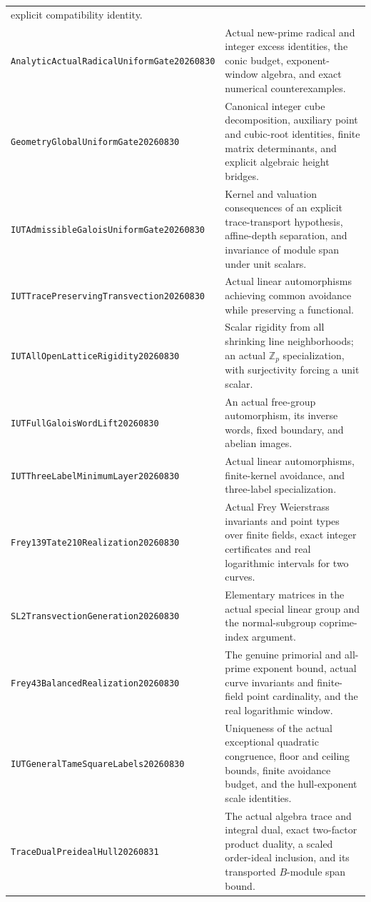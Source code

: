 \documentclass[11pt]{amsart}
\theoremstyle{definition}
\theoremstyle{remark}
\newcommand{\Z}{\mathbb Z}
\begin{document}
\begin{longtable}{>{\raggedright\arraybackslash}p{}>{\raggedright\arraybackslash}p{}}
explicit compatibility identity.\\[3pt]
\texttt{AnalyticActualRadical\allowbreak UniformGate20260830} & Actual new-prime
radical and integer excess identities, the conic budget, exponent-window
algebra, and exact numerical counterexamples.\\[3pt]
\texttt{GeometryGlobal\allowbreak UniformGate20260830} & Canonical integer cube
decomposition, auxiliary point and cubic-root identities, finite matrix
determinants, and explicit algebraic height bridges.\\[3pt]
\texttt{IUTAdmissibleGalois\allowbreak UniformGate20260830} & Kernel and valuation
consequences of an explicit trace-transport hypothesis, affine-depth
separation, and invariance of module span under unit scalars.\\[3pt]
\texttt{IUTTracePreserving\allowbreak Transvection20260830} & Actual linear
automorphisms achieving common avoidance while preserving a functional.\\[3pt]
\texttt{IUTAllOpenLattice\allowbreak Rigidity20260830} & Scalar rigidity from
all shrinking line neighborhoods; an actual $\Z_p$ specialization, with
surjectivity forcing a unit scalar.\\[3pt]
\texttt{IUTFullGalois\allowbreak WordLift20260830} & An actual free-group
automorphism, its inverse words, fixed boundary, and abelian images.\\[3pt]
\texttt{IUTThreeLabel\allowbreak MinimumLayer20260830} & Actual linear
automorphisms, finite-kernel avoidance, and three-label specialization.\\[3pt]
\texttt{Frey139Tate210\allowbreak Realization20260830} & Actual Frey
Weierstrass invariants and point types over finite fields, exact integer
certificates and real logarithmic intervals for two curves.\\[3pt]
\texttt{SL2Transvection\allowbreak Generation20260830} & Elementary
matrices in the actual special linear group and the normal-subgroup
coprime-index argument.\\[3pt]
\texttt{Frey43Balanced\allowbreak Realization20260830} & The genuine
primorial and all-prime exponent bound, actual curve invariants and
finite-field point cardinality, and the real logarithmic window.\\[3pt]
\texttt{IUTGeneralTame\allowbreak SquareLabels20260830} & Uniqueness of
the actual exceptional quadratic congruence, floor and ceiling bounds,
finite avoidance budget, and the hull-exponent scale identities.\\
\texttt{TraceDualPreideal\allowbreak Hull20260831} & The actual algebra
trace and integral dual, exact two-factor product duality, a scaled
order-ideal inclusion, and its transported $B$-module span bound.\\
\bottomrule
\end{longtable}
\end{document}
